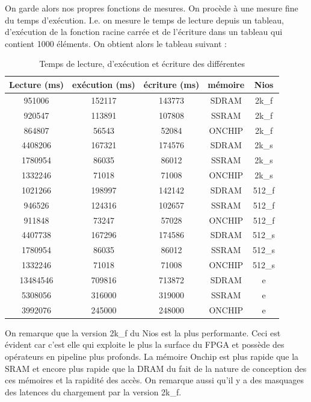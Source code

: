 \documentclass[12pt,a4paper]{article}
\begin{document}
On garde alors nos propres fonctions de mesures. On procède à une mesure fine du temps d'exécution. I.e. on  mesure le temps de lecture depuis un tableau, d'exécution de la fonction racine carrée et de l'écriture dans un tableau qui contient 1000 éléments. On obtient alors le tableau suivant :
\begin{table}[H]
	\centering
	\begin{tabular}{|c|c|c|c|c|}
		\hline
		Lecture (ms) & exécution (ms) & écriture (ms) & mémoire &  Nios  \\ \hline
		   951006    &     152117     &    143773     &  SDRAM  & 2k\_f  \\ \hline
		   920547    &     113891     &    107808     &  SSRAM  & 2k\_f  \\ \hline
		   864807    &     56543      &     52084     & ONCHIP  & 2k\_f  \\
		   \hline		  \hline
		  4408206    &     167321     &    174576     &  SDRAM  & 2k\_s  \\ \hline
		  1780954    &     86035      &     86012     &  SSRAM  & 2k\_s  \\ \hline
		  1332246    &     71018      &     71008     & ONCHIP  & 2k\_s  \\ 

		  \hline		  \hline

		  1021266    &     198997     &    142142     &  SDRAM  & 512\_f \\ \hline
		   946526    &     124316     &    102657     &  SSRAM  & 512\_f \\ \hline
		   911848    &     73247      &     57028     & ONCHIP  & 512\_f \\ 

		   \hline		  \hline

		  4407738    &     167296     &    174586     &  SDRAM  & 512\_s \\ \hline
		  1780954    &     86035      &     86012     &  SSRAM  & 512\_s \\ \hline
		  1332246    &     71018      &     71008     & ONCHIP  & 512\_s \\ 
		  \hline		  \hline

		  13484546    &     709816     &    713872     &  SDRAM  &   e    \\ \hline
		  5308056    &     316000     &    319000     &  SSRAM  &   e    \\ \hline
		  3992076    &     245000     &    248000     & ONCHIP  &   e    \\ \hline
	\end{tabular} 
\caption{Temps de lecture, d'exécution et écriture des différentes}
\end{table}
On remarque que la version 2k\_f du Nios est la plus performante. Ceci est évident car c'est elle qui exploite le plus la surface du FPGA et possède des opérateurs en pipeline plus profonds. La mémoire Onchip est plus rapide que la SRAM et encore plus rapide que la DRAM du fait de la nature de conception des ces mémoires et la rapidité des accès. On remarque aussi qu'il y a des masquages des latences du chargement par la version 2k\_f.
\end{document}
